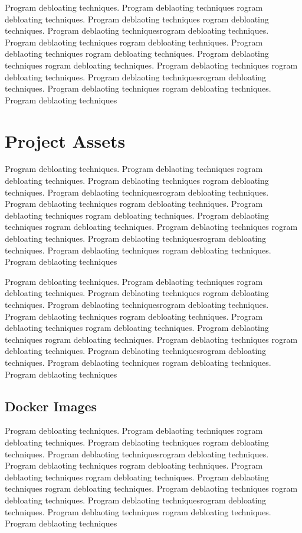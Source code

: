 \documentclass{relatorio}
\begin{document}
Program debloating techniques. Program deblaoting techniques rogram debloating techniques. Program deblaoting techniques
rogram debloating techniques. Program deblaoting techniquesrogram debloating techniques. Program deblaoting techniques
rogram debloating techniques. Program deblaoting techniques rogram debloating techniques. Program deblaoting techniques
rogram debloating techniques. Program deblaoting techniques 
rogram debloating techniques. Program deblaoting techniquesrogram debloating techniques. Program deblaoting techniques
rogram debloating techniques. Program deblaoting techniques

\section{Project Assets}%
\label{Tools}

Program debloating techniques. Program deblaoting techniques rogram debloating techniques. Program deblaoting techniques
rogram debloating techniques. Program deblaoting techniquesrogram debloating techniques. Program deblaoting techniques
rogram debloating techniques. Program deblaoting techniques rogram debloating techniques. Program deblaoting techniques
rogram debloating techniques. Program deblaoting techniques 
rogram debloating techniques. Program deblaoting techniquesrogram debloating techniques. Program deblaoting techniques
rogram debloating techniques. Program deblaoting techniques

Program debloating techniques. Program deblaoting techniques rogram debloating techniques. Program deblaoting techniques
rogram debloating techniques. Program deblaoting techniquesrogram debloating techniques. Program deblaoting techniques
rogram debloating techniques. Program deblaoting techniques rogram debloating techniques. Program deblaoting techniques
rogram debloating techniques. Program deblaoting techniques 
rogram debloating techniques. Program deblaoting techniquesrogram debloating techniques. Program deblaoting techniques
rogram debloating techniques. Program deblaoting techniques

\subsection{Docker Images}%
\label{Tools}

Program debloating techniques. Program deblaoting techniques rogram debloating techniques. Program deblaoting techniques
rogram debloating techniques. Program deblaoting techniquesrogram debloating techniques. Program deblaoting techniques
rogram debloating techniques. Program deblaoting techniques rogram debloating techniques. Program deblaoting techniques
rogram debloating techniques. Program deblaoting techniques 
rogram debloating techniques. Program deblaoting techniquesrogram debloating techniques. Program deblaoting techniques
rogram debloating techniques. Program deblaoting techniques
\end{document}
